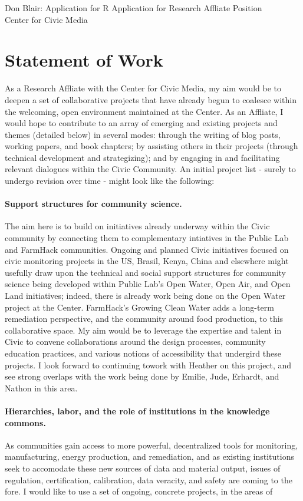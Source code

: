 \documentclass[12pt]{article}
\begin{document}
Don Blair: Application for R
Application for Research Affliate Position \\
Center for Civic Media \\
\section*{Statement of Work}

As a Research Affliate with the Center for Civic Media, my aim would be to deepen a set of collaborative projects that have already begun to coalesce within the welcoming, open environment maintained at the Center. As an Affliate, I would hope to contribute to an array of emerging and existing projects and themes (detailed below) in several modes: through the writing of blog posts, working papers, and book chapters; by assisting others in their projects (through technical development and strategizing); and by engaging in and facilitating relevant dialogues within the Civic Community.  An initial project list - surely to undergo revision over time - might look like the following:

\paragraph{Support structures for community science.} The aim here is to build on initiatives already underway within the Civic community by connecting them to complementary intiatives in the Public Lab and FarmHack communities.  Ongoing and planned Civic initiatives focused on civic monitoring projects in the US, Brasil, Kenya, China and elsewhere might usefully draw upon the technical and social support structures for community science being developed within Public Lab's Open Water, Open Air, and Open Land initiatives; indeed, there is already work being done on the Open Water project at the Center.  FarmHack's Growing Clean Water adds a long-term remediation perspective, and the community around food production, to this collaborative space.  My aim would be to leverage the expertise and talent in Civic to convene collaborations around the design processes, community education practices, and various notions of accessibility that undergird these projects.  I look forward to continuing towork with Heather on this project, and see strong overlaps with the work being done by Emilie, Jude, Erhardt, and Nathon in this area.

\paragraph{Hierarchies, labor, and the role of institutions in the knowledge commons.} As communities gain access to more powerful, decentralized tools for monitoring, manufacturing, energy production, and remediation, and as existing institutions seek to accomodate these new sources of data and material output, issues of regulation, certification, calibration, data veracity, and safety are coming to the fore.  I would like to use a set of ongoing, concrete projects, in the areas of 
\end{document}
